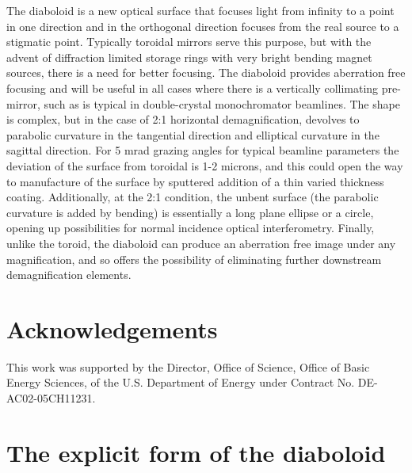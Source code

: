 \documentclass{iucr}              %
\begin{document}
The diaboloid is a new optical surface that focuses light from infinity to a point in one direction and in the orthogonal direction focuses from the real source to a stigmatic point.  Typically toroidal mirrors serve this purpose, but with the advent of diffraction limited storage rings with very bright bending magnet sources, there is a need for better focusing. The diaboloid provides aberration free focusing and will be useful in all cases where there is a vertically collimating pre-mirror, such as is typical in double-crystal monochromator beamlines. The shape is complex, but in the case of 2:1 horizontal demagnification, devolves to parabolic curvature in the tangential direction and elliptical curvature in the sagittal direction. For 5 mrad grazing angles for typical beamline parameters the deviation of the surface from toroidal is 1-2 microns, and this could open the way to manufacture of the surface by sputtered addition of a thin varied thickness coating.  Additionally, at the 2:1 condition, the unbent surface (the parabolic curvature is added by bending) is essentially a long plane ellipse or a circle, opening up possibilities for normal incidence optical interferometry.  Finally, unlike the toroid, the diaboloid can produce an aberration free image under any magnification, and so offers the possibility of eliminating further downstream demagnification elements. 







\vspace{5mm}
\section{Acknowledgements}       
 
 
This work was supported by the Director, Office of Science, Office of Basic Energy Sciences, of the U.S. Department of Energy under Contract No. DE-AC02-05CH11231.

\appendix

\section{The explicit form of the diaboloid }
\label{appendix:diaboloid}
\end{document}
